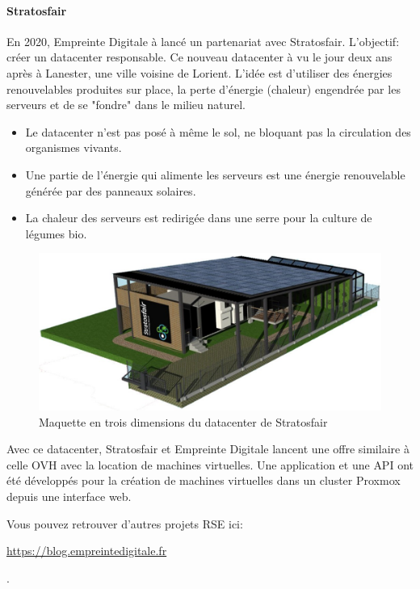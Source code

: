 \documentclass[12pt]{article}
\begin{document}
\paragraph{Stratosfair}
En 2020, Empreinte Digitale à lancé un partenariat avec Stratosfair. 
L'objectif: créer un datacenter responsable. 
Ce nouveau datacenter à vu le jour deux ans après à Lanester, une ville voisine de Lorient. 
L'idée est d'utiliser des énergies renouvelables produites sur place, la perte d'énergie (chaleur) engendrée par les serveurs et de se "fondre" dans le milieu naturel.
\begin{itemize}
    \item Le datacenter n'est pas posé à même le sol, ne bloquant pas la circulation des organismes vivants.
    \item Une partie de l'énergie qui alimente les serveurs est une énergie renouvelable générée par des panneaux solaires.
    \item La chaleur des serveurs est redirigée dans une serre pour la culture de légumes bio.
\end{itemize}

\begin{figure}[!ht]
    \centering
    \includegraphics[width=\textwidth]{src/strato.jpg}
    \caption{Maquette en trois dimensions du datacenter de Stratosfair}
    \label{fig:strato}
\end{figure}

Avec ce datacenter, Stratosfair et Empreinte Digitale lancent une offre similaire à celle OVH avec la location de machines virtuelles.
Une application et une \gls{API} ont été développés pour la création de machines virtuelles dans un \gls{cluster} \gls{Proxmox} depuis une interface web.

Vous pouvez retrouver d'autres projets \gls{RSE} ici: \begin{hilite} \url{https://blog.empreintedigitale.fr} \end{hilite}.
\end{document}
